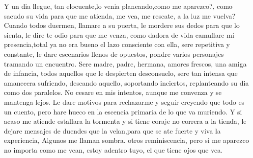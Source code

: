 \documentclass[12pt, a4paper, twoside]{book} %
\begin{document}
Y un dia llegue, tan elocuente,lo venia planeando,como me aparezco?, como sacudo su vida para que me atienda, me vea, me rescate, a la luz me vuelva?
Cuando todos duermen, llamare a su puerta, le mordere sus dedos para que lo sienta, le dire te odio para que me venza, como dadora de vida camuflare mi presencia,total ya no era bueno el lazo consciente con ella, sere repetitiva y constante, le dare escenarios llenos de opuestos, pondre varios personajes tramando  un encuentro.
Sere madre, padre, hermana, amores frescos, una amiga de infancia, todos aquellos que le despierten desconsuelo, sere tan intensa que amanecera sufriendo, deseando aquello, soportando inciertos, replanteando su dia como dos paralelos.
No cesare en mis intentos, aunque me convenza y se mantenga lejos.
Le dare motivos para rechazarme y seguir creyendo que todo es un cuento, pero hare hueco en la escencia primaria de lo que va muriendo.
Y si acaso me atiende estallara la tormenta y si tiene coraje no correra a la tienda, le dejare mensajes de duendes que la velan,para que se ate fuerte y viva la experiencia,
Algunos me llaman sombra. otros reminiscencia, pero si me aparezco no importa como me vean, estoy adentro tuyo, el que tiene ojos que vea.

\chapter{}
\end{document}
